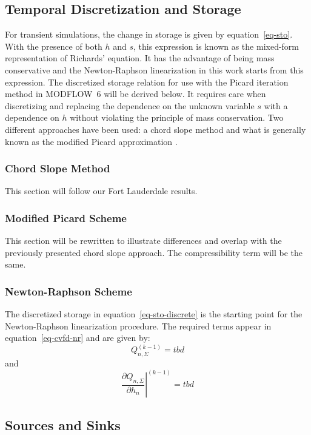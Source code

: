 \documentclass[fleqn]{article}
\begin{document}
\subsection{Temporal Discretization and Storage}
For transient simulations, the change in storage is given by
equation~\ref{eq-sto}. With the presence of both $h$ and $s$,
this expression is known as the mixed-form representation
of Richards' equation. It has the advantage of being mass
conservative and the Newton-Raphson linearization in this work
starts from this expression. The discretized storage relation
for use with the Picard iteration method in MODFLOW~6 will be
derived below. It requires care when discretizing and replacing 
the dependence on the unknown variable $s$ with a dependence
on $h$ without violating the principle of mass conservation.
Two different approaches have been used: a chord slope method
\cite{?} and what is generally known as the modified Picard
approximation \cite{celia-1990}.

\subsubsection*{Chord Slope Method}
This section will follow our Fort Lauderdale results.

\subsubsection*{Modified Picard Scheme}
This section will be rewritten to illustrate differences and
overlap with the previously presented chord slope approach.
The compressibility term will be the same.

\subsubsection*{Newton-Raphson Scheme}
The discretized storage in equation~\ref{eq-sto-discrete} is the starting
point for the Newton-Raphson linearization procedure. The required 
terms appear in equation~\ref{eq-cvfd-nr} and are given by:
\begin{equation}
  Q_{n,\Sigma}^{(k-1)} = tbd
\end{equation}
and
\begin{equation}
  \left.\frac{\partial Q_{n,\Sigma}}{\partial h_n}\right|^{(k-1)} = tbd
\end{equation}

\subsection{Sources and Sinks}
\end{document}
